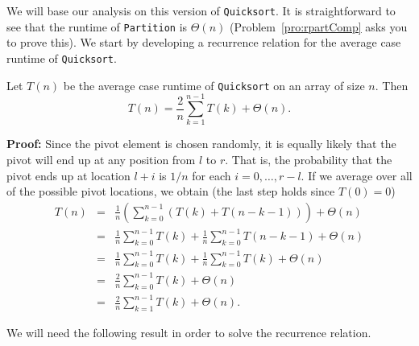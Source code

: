 We will base our analysis on this version of \verb+Quicksort+.
It is straightforward to see that the runtime of 
\verb+Partition+ is $\Theta(n)$ (Problem~\ref{pro:rpartComp}
asks you to prove this). 
We start by developing a recurrence
relation for the average case runtime of \verb+Quicksort+.
\begin{thm}
Let $T(n)$ be the average case runtime of \verb+Quicksort+ on an
array of size $n$.  Then 
$$T(n)=\frac{2}{ n}\sum_{k=1}^{n-1} T(k) +\Theta(n).$$

\noindent
{\bf Proof: }
Since the pivot element is chosen randomly, it is equally likely that
the pivot will end up at any position from $l$ to $r$.
That is, the probability that the pivot ends up at location $l+i$ 
is $1/n$ for each $i=0,\ldots, r-l$.  If we average over all of the possible
pivot locations, we obtain (the last step holds since $T(0)=0$)
\begin{eqnarray*}
T(n)&=&\frac{1}{ n}\left( \sum_{k=0}^{n-1}\left(T(k)+T(n-k-1)\right)\right)
+\Theta(n)\\
&=&\frac{1}{ n}\sum_{k=0}^{n-1} T(k) 
+\frac{1}{ n}\sum_{k=0}^{n-1}T(n-k-1) +\Theta(n)\\
&=&\frac{1}{ n}\sum_{k=0}^{n-1} T(k) 
+\frac{1}{ n}\sum_{k=0}^{n-1}T(k) +\Theta(n)\\
&=&\frac{2}{ n}\sum_{k=0}^{n-1} T(k) +\Theta(n)\\
&=&\frac{2}{ n}\sum_{k=1}^{n-1} T(k) +\Theta(n).
\end{eqnarray*}
\end{thm}

We will need the following result in order to solve the recurrence relation.

